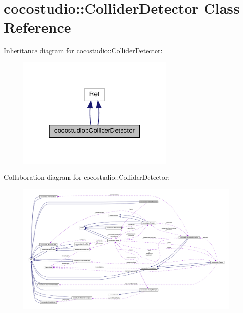 \hypertarget{classcocostudio_1_1ColliderDetector}{}\section{cocostudio\+:\+:Collider\+Detector Class Reference}
\label{classcocostudio_1_1ColliderDetector}


Inheritance diagram for cocostudio\+:\+:Collider\+Detector\+:
\nopagebreak
\begin{figure}[H]
\begin{center}
\leavevmode
\includegraphics[width=220pt]{classcocostudio_1_1ColliderDetector__inherit__graph}
\end{center}
\end{figure}


Collaboration diagram for cocostudio\+:\+:Collider\+Detector\+:
\nopagebreak
\begin{figure}[H]
\begin{center}
\leavevmode
\includegraphics[width=350pt]{classcocostudio_1_1ColliderDetector__coll__graph}
\end{center}
\end{figure}
